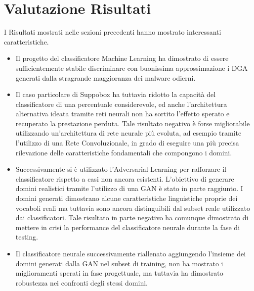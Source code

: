 \section{Valutazione Risultati}
I Risultati mostrati nelle sezioni precedenti hanno mostrato interessanti caratteristiche. 
\begin{itemize}
\item Il progetto del classificatore Machine Learning ha dimostrato di essere sufficientemente stabile discriminare con buonissima approssimazione i DGA generati dalla stragrande maggioranza dei malware odierni. 

\item Il caso particolare di Suppobox ha tuttavia ridotto la capacità del classificatore di una percentuale considerevole, ed anche l'architettura alternativa ideata tramite reti neurali non ha sortito l'effetto sperato e recuperato la prestazione perduta. 
Tale risultato negativo è forse migliorabile utilizzando un'architettura di rete neurale più evoluta, ad esempio tramite l'utilizzo di una Rete Convoluzionale, in grado di eseguire una più precisa rilevazione delle caratteristiche fondamentali che compongono i domini.

\item Successivamente si è utilizzato l'Adversarial Learning per rafforzare il classificatore rispetto a casi non ancora esistenti. L'obiettivo di generare domini realistici tramite l'utilizzo di una GAN è stato in parte raggiunto. I domini generati dimostrano alcune caratteristiche linguistiche proprie dei vocaboli reali ma tuttavia sono ancora distinguibili dal subset reale utilizzato dai classificatori.
Tale risultato in parte negativo ha comunque dimostrato di mettere in crisi la performance del classificatore neurale durante la fase di testing.

\item Il classificatore neurale successivamente riallenato aggiungendo l'insieme dei domini generati dalla GAN nel subset di training, non ha mostrato i miglioramenti sperati in fase progettuale, ma tuttavia ha dimostrato robustezza nei confronti degli stessi domini.
\end{itemize}